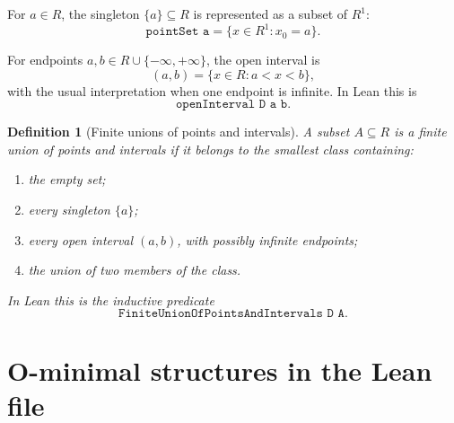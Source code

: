 \documentclass[11pt]{article}
\newtheorem{definition}{Definition}[section]
\newcommand{\Lean}[1]{\texttt{#1}}
\begin{document}
For $a\in R$, the singleton $\{a\}\subseteq R$ is represented as a subset of $R^1$:
\[
  \Lean{pointSet a}=\bigl\{x\in R^1:x_0=a\bigr\}.
\]

For endpoints $a,b\in R\cup\{-\infty,+\infty\}$, the open interval is
\[
  (a,b)=\{x\in R:a<x<b\},
\]
with the usual interpretation when one endpoint is infinite.  In Lean this is
\[
  \Lean{openInterval D a b}.
\]

\begin{definition}[Finite unions of points and intervals]
A subset $A\subseteq R$ is a finite union of points and intervals if it belongs to the smallest class
containing:
\begin{enumerate}[label=(\roman*)]
  \item the empty set;
  \item every singleton $\{a\}$;
  \item every open interval $(a,b)$, with possibly infinite endpoints;
  \item the union of two members of the class.
\end{enumerate}
In Lean this is the inductive predicate
\[
  \Lean{FiniteUnionOfPointsAndIntervals D A}.
\]
\end{definition}

\section{O-minimal structures in the Lean file}
\end{document}
